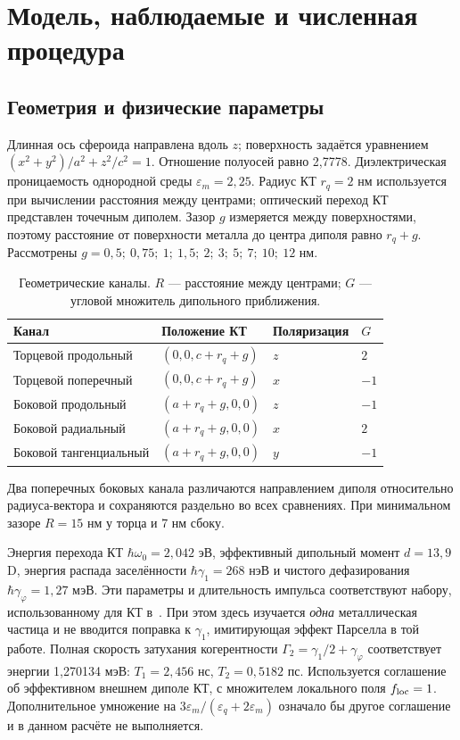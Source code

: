 \section{Модель, наблюдаемые и численная процедура}
\subsection{Геометрия и физические параметры}
Длинная ось сфероида направлена вдоль $z$; поверхность задаётся уравнением
$(x^2+y^2)/a^2+z^2/c^2=1$. Отношение полуосей равно 2,7778.
Диэлектрическая проницаемость однородной среды $\varepsilon_m=2{,}25$.
Радиус КТ $r_q=2$ нм используется при вычислении расстояния между
центрами; оптический переход КТ представлен точечным диполем.
Зазор $g$ измеряется между поверхностями, поэтому расстояние от
поверхности металла до центра диполя равно $r_q+g$.
Рассмотрены $g=0{,}5;\ 0{,}75;\ 1;\ 1{,}5;\ 2;\ 3;\ 5;\ 7;\ 10;\ 12$ нм.

\begin{table}[!htbp]\centering\small
\caption{Геометрические каналы. $R$ --- расстояние между центрами;
$G$ --- угловой множитель дипольного приближения.}
\label{tab:geometry}
\begin{tabular}{p{4.0cm}lll}
\toprule
Канал & Положение КТ & Поляризация & $G$\\\midrule
Торцевой продольный & $(0,0,c+r_q+g)$ & $z$ & $2$\\
Торцевой поперечный & $(0,0,c+r_q+g)$ & $x$ & $-1$\\
Боковой продольный & $(a+r_q+g,0,0)$ & $z$ & $-1$\\
Боковой радиальный & $(a+r_q+g,0,0)$ & $x$ & $2$\\
Боковой тангенциальный & $(a+r_q+g,0,0)$ & $y$ & $-1$\\\bottomrule
\end{tabular}
\end{table}
Два поперечных боковых канала различаются направлением диполя относительно
радиуса-вектора и сохраняются раздельно во всех сравнениях.
При минимальном зазоре $R=15$ нм у торца и 7 нм сбоку.

Энергия перехода КТ $\hbar\omega_0=2{,}042$ эВ, эффективный дипольный
момент $d=13{,}9$ D, энергия распада заселённости
$\hbar\gamma_1=268$ нэВ и чистого дефазирования
$\hbar\gamma_\varphi=1{,}27$ мэВ. Эти параметры и длительность импульса
соответствуют набору, использованному для КТ в~\cite{shah2013}.
При этом здесь изучается \emph{одна} металлическая частица и не вводится
поправка к $\gamma_1$, имитирующая эффект Парселла в той работе.
Полная скорость затухания когерентности
$\Gamma_2=\gamma_1/2+\gamma_\varphi$ соответствует энергии
1,270134 мэВ: $T_1=2{,}456$ нс, $T_2=0{,}5182$ пс.
Используется соглашение об эффективном внешнем диполе КТ, с множителем
локального поля $f_{\rm loc}=1$. Дополнительное умножение на
$3\varepsilon_m/(\varepsilon_q+2\varepsilon_m)$ означало бы другое
соглашение и в данном расчёте не выполняется.

